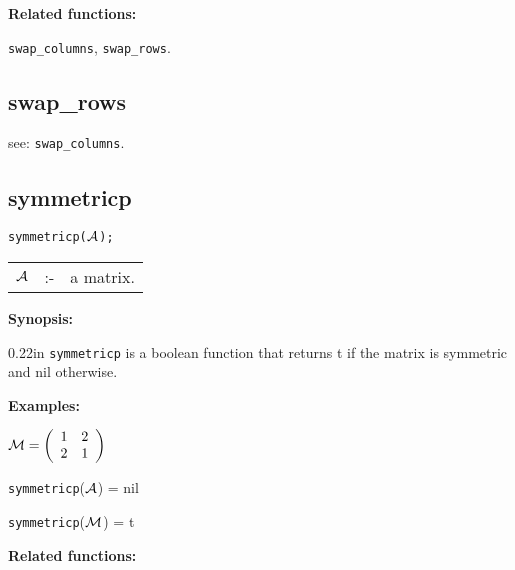 {\bf Related functions:}

\hspace*{0.175in} {\tt swap\_columns}, {\tt swap\_rows}.


\subsection{swap\_rows}

\hspace*{0.175in} see: {\tt swap\_columns}.


\subsection{symmetricp}


\hspace*{0.175in} {\tt symmetricp(${\cal A}$);}

\hspace*{0.1in}
\begin{tabular}{l l l}
${\cal A}$ &:-& a matrix.
\end{tabular}

{\bf Synopsis:} %

\begin{addtolength}{\leftskip}{0.22in}
{\tt symmetricp} is a boolean function that returns t if the
                matrix is symmetric and nil otherwise.

\end{addtolength}

{\bf Examples:}

\begin{flushleft}
\hspace*{0.175in}
\begin{math}
{\cal M} = \left( \begin{array}{cc} 1 & 2 \\ 2 & 1
\end{array} \right)
\end{math}
\end{flushleft}

\vspace*{0.1in}

\hspace*{0.175in} {\tt symmetricp}(${\cal A}$) = nil

\hspace*{0.175in} {\tt symmetricp}(${\cal M}$) = t

{\bf Related functions:}


